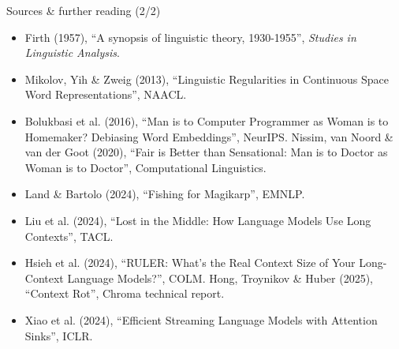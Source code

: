 \documentclass[aspectratio=169]{beamer}
\begin{document}
\begin{frame}{Sources \& further reading (2/2)}
  \footnotesize
  \begin{itemize}
    \item Firth (1957), ``A synopsis of linguistic theory, 1930-1955'', \emph{Studies in
      Linguistic Analysis}.
    \item Mikolov, Yih \& Zweig (2013), ``Linguistic Regularities in Continuous Space Word
      Representations'', NAACL.
    \item Bolukbasi et al. (2016), ``Man is to Computer Programmer as Woman is to Homemaker?
      Debiasing Word Embeddings'', NeurIPS. Nissim, van Noord \& van der Goot (2020), ``Fair is
      Better than Sensational: Man is to Doctor as Woman is to Doctor'', Computational Linguistics.
    \item Land \& Bartolo (2024), ``Fishing for Magikarp'', EMNLP.
    \item Liu et al. (2024), ``Lost in the Middle: How Language Models Use Long Contexts'', TACL.
    \item Hsieh et al. (2024), ``RULER: What's the Real Context Size of Your Long-Context Language
      Models?'', COLM. Hong, Troynikov \& Huber (2025), ``Context Rot'', Chroma technical report.
    \item Xiao et al. (2024), ``Efficient Streaming Language Models with Attention Sinks'', ICLR.
  \end{itemize}
\end{frame}
\end{document}
